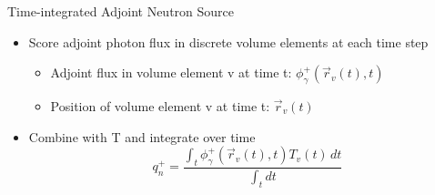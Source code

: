 \documentclass{beamer}
\begin{document}
\begin{frame}{Time-integrated Adjoint Neutron Source}
	\begin{itemize}
		\item{Score adjoint photon flux in discrete volume elements at
			each time step}
	   \begin{itemize}
	   \item	{Adjoint flux in volume element v at time t: 
		   $\phi_{\gamma}^{+}(\overrightarrow{r}_{v}(t), t)$ }
	   \item  {Position of volume element v at time t:
	   	$\overrightarrow{r}_{v}(t)$ }
	   \end{itemize}
   \item{ Combine with T and integrate over time}
        \begin{equation}\label{eq:adj_src_1_avg}
		q_{n}^{+} = \frac
		{\int_{t}  \phi_{\gamma}^{+}(\overrightarrow{r}_{v}(t), t)
		 T_v(t)\, dt}
		 {\int_t dt}
        \end{equation}
	\end{itemize}




\end{frame}
\end{document}
